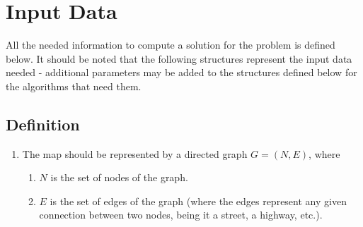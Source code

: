 \documentclass[a4paper, 12pt]{report}
\begin{document}
    \section{Input Data} \label{idata}
    
    All the needed information to compute a solution for the problem is defined below. It should be noted that the following structures represent the input data needed - additional parameters may be added to the structures defined below for the algorithms that need them.
    
    \subsection{Definition}
    
    \begin{enumerate}
        \item The map should be represented by a directed graph $G = (N,E)$, where
        \begin{enumerate}
            \item $N$ is the set of nodes of the graph.
            \item $E$ is the set of edges of the graph (where the edges represent any given connection between two nodes, being it a street, a highway, etc.).
        \end{enumerate}
    

\end{enumerate}
\end{document}
